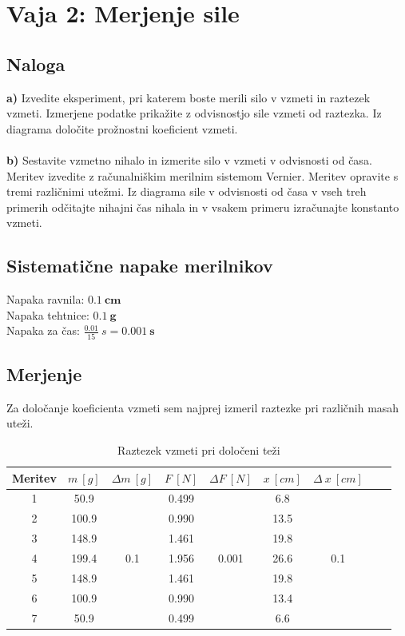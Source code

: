 \documentclass{report}
\begin{document}
\chapter{Vaja 2: Merjenje sile}

\section{Naloga}

\textbf{a)} Izvedite eksperiment, pri katerem boste merili silo v vzmeti in raztezek vzmeti. 
Izmerjene podatke prikažite z odvisnostjo sile vzmeti od raztezka. 
Iz diagrama določite prožnostni koeficient vzmeti.
\\\\
\textbf{b)} Sestavite vzmetno nihalo in izmerite silo v vzmeti v odvisnosti od časa. 
Meritev izvedite z računalniškim merilnim sistemom Vernier. 
Meritev opravite s tremi različnimi utežmi. 
Iz diagrama sile v odvisnosti od časa v vseh treh primerih odčitajte nihajni čas nihala in v vsakem primeru izračunajte konstanto vzmeti.

\section{Sistematične napake merilnikov}

Napaka ravnila: $\bm{0.1 \ cm}$ \\
Napaka tehtnice: $\bm{0.1 \ g}$ \\
Napaka za čas: $\frac{0.01}{15} \ s = \bm{0.001 \ s}$

\pagebreak

\section{Merjenje}

Za določanje koeficienta vzmeti sem najprej izmeril raztezke pri različnih masah uteži.

\begin{table}[H]
  \label{table:F(x)}
  \centering
  \caption{Raztezek vzmeti pri določeni teži}
  \begin{adjustwidth}{0cm}{0cm}
  \begin{tabular}{ccccccccc}
  \toprule
  Meritev & $m \ [g]$ & $\Delta m \ [g]$ & $ F \ [N] $ & $\Delta F \ [N]$ & $ x \ [cm] $ & $\Delta \ x \ [cm]$  \\
  \midrule
  1 & 50.9 & \multirow{7}{*}{0.1} & 0.499 & \multirow{7}{*}{0.001} & 6.8 & \multirow{7}{*}{0.1} & \\
  2 & 100.9 &  & 0.990 & & 13.5 & \\
  3 & 148.9 &  & 1.461 & & 19.8 &  \\
  4 & 199.4 &  & 1.956 & & 26.6 & \\
  5 & 148.9 &  & 1.461 & & 19.8 & \\
  6 & 100.9 &  & 0.990 & & 13.4 & \\
  7 & 50.9 &  & 0.499 & & 6.6 & \\
  \bottomrule
  \end{tabular}
  \end{adjustwidth}
\end{table}
\end{document}
